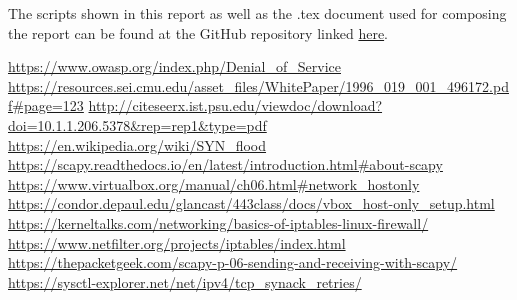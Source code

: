 \documentclass[11pt]{article}
\begin{document}
The scripts shown in this report as well as the .tex document used for composing the report can be found at the GitHub repository linked \href{https://github.com/beagaliana/syn-flooding-attack}{here}.\vspace{5mm}

\url{https://www.owasp.org/index.php/Denial\_of\_Service}\break
\url{https://resources.sei.cmu.edu/asset\_files/WhitePaper/1996\_019\_001\_496172.pdf#page=123}\break
\url{http://citeseerx.ist.psu.edu/viewdoc/download?doi=10.1.1.206.5378&rep=rep1&type=pdf}\break
\url{https://en.wikipedia.org/wiki/SYN\_flood}\break
\url{https://scapy.readthedocs.io/en/latest/introduction.html#about-scapy}\break
\url{https://www.virtualbox.org/manual/ch06.html#network\_hostonly}\break
\url{https://condor.depaul.edu/glancast/443class/docs/vbox\_host-only\_setup.html}\break
\url{https://kerneltalks.com/networking/basics-of-iptables-linux-firewall/}\break
\url{https://www.netfilter.org/projects/iptables/index.html}\break
\url{https://thepacketgeek.com/scapy-p-06-sending-and-receiving-with-scapy/}\break
\url{https://sysctl-explorer.net/net/ipv4/tcp\_synack\_retries/}\break

\printindex
\end{document}
